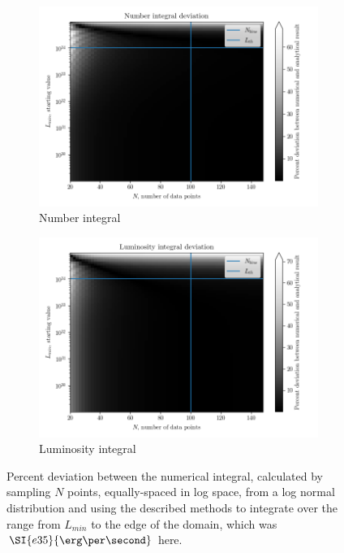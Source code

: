 \documentclass{C://Aliases//Dropbox-MIT//Latex_Templates//personal}
\begin{document}
\begin{figure}[h]
    \centering
    \begin{subfigure}{.49\textwidth}
        \includegraphics[width=0.99\linewidth]{num-integral-deviation.png}
        \caption{Number integral}
    \end{subfigure}
    \begin{subfigure}{.49\textwidth}
        \includegraphics[width=0.99\linewidth]{lum-integral-deviation.png}
        \caption{Luminosity integral}
    \end{subfigure}
    \caption{Percent deviation between the numerical integral, calculated by sampling $N$ points, equally-spaced in log space, from a log normal distribution and using the described methods to integrate over the range from $L_{min}$ to the edge of the domain, which was $\SI{e35}{\erg\per\second}$ here.}
    \label{fig:compare-integral}
\end{figure}
\end{document}
